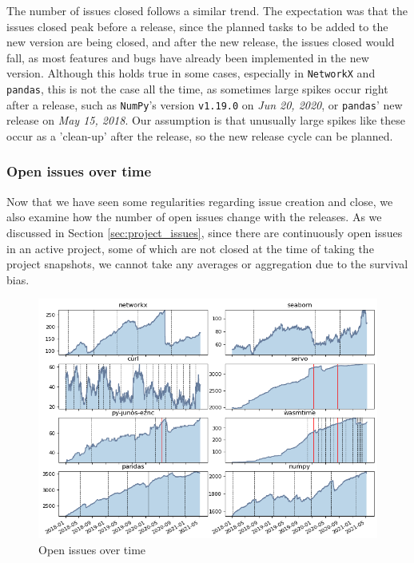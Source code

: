 The number of issues closed follows a similar trend. The expectation was that the issues closed peak before a release, since the planned tasks to be added to the new version are being closed, and after the new release, the issues closed would fall, as most features and bugs have already been implemented in the new version. Although this holds true in some cases, especially in \texttt{NetworkX} and \texttt{pandas}, this is not the case all the time, as sometimes large spikes occur right after a release, such as \texttt{NumPy}'s version \texttt{v1.19.0} on \textit{Jun 20, 2020}, or \texttt{pandas}' new release on \textit{May 15, 2018}. Our assumption is that unusually large spikes like these occur as a 'clean-up' after the release, so the new release cycle can be planned.

\subsubsection{Open issues over time}

Now that we have seen some regularities regarding issue creation and close, we also examine how the number of open issues change with the releases. As we discussed in Section \ref{sec:project_issues}, since there are continuously open issues in an active project, some of which are not closed at the time of taking the project snapshots, we cannot take any averages or aggregation due to the survival bias.

\begin{figure}
    \centering
    \includegraphics[width=\textwidth]{figures/qualitative/issues_closed_created/open_issues.png}
    \caption{Open issues over time}
    \label{fig:open_issues}
\end{figure}

